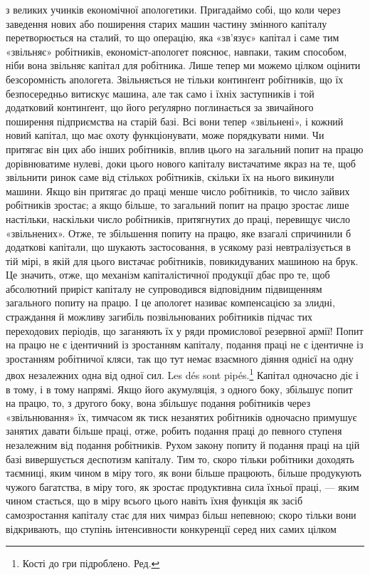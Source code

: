 \parcont{}  %
з великих учинків економічної апологетики. Пригадаймо собі,
що коли через заведення нових або поширення старих машин
частину змінного капіталу перетворюється на сталий, то що
операцію, яка «зв’язує» капітал і саме тим «звільняє» робітників,
економіст-апологет пояснює, навпаки, таким способом,
ніби вона звільняє капітал для робітника. Лише тепер ми можемо
цілком оцінити безсоромність апологета. Звільняється не тільки
континґент робітників, що їх безпосередньо витискує машина,
але так само і їхніх заступників і той додатковий континґент,
що його реґулярно поглинається за звичайного поширення підприємства
на старій базі. Всі вони тепер «звільнені», і кожний
новий капітал, що має охоту функціонувати, може порядкувати
ними. Чи притягає він цих або інших робітників, вплив цього
на загальний попит на працю дорівнюватиме нулеві, доки цього
нового капіталу вистачатиме якраз на те, щоб звільнити ринок
саме від стількох робітників, скільки їх на нього викинули машини.
Якщо він притягає до праці менше число робітників, то
число зайвих робітників зростає; а якщо більше, то загальний
попит на працю зростає лише настільки, наскільки число робітників,
притягнутих до праці, перевищує число «звільнених».
Отже, те збільшення попиту на працю, яке взагалі спричинили б
додаткові капітали, що шукають застосовання, в усякому разі
невтралізується в тій мірі, в якій для цього вистачає робітників,
повикидуваних машиною на брук. Це значить, отже, що механізм
капіталістичної продукції дбає про те, щоб абсолютний приріст
капіталу не супроводився відповідним підвищенням загального
попиту на працю. І це апологет називає компенсацією за злидні,
страждання й можливу загибіль позвільнюваних робітників підчас
тих переходових періодів, що заганяють їх у ряди промислової
резервної армії! Попит на працю не є ідентичний із зростанням
капіталу, подання праці не є ідентичне із зростанням робітничої
кляси, так що тут немає взаємного діяння однієї на одну двох
незалежних одна від одної сил. Les dés sont pipés.\footnote*{
Кості до гри підроблено. Ред.
} Капітал
одночасно діє і в тому, і в тому напрямі. Якщо його акумуляція,
з одного боку, збільшує попит на працю, то, з другого боку,
вона збільшує подання робітників через «звільнювання» їх,
тимчасом як тиск незанятих робітників одночасно примушує
занятих давати більше праці, отже, робить подання праці до
певного ступеня незалежним від подання робітників. Рухом закону
попиту й подання праці на цій базі вивершується деспотизм
капіталу. Тим то, скоро тільки робітники доходять таємниці,
яким чином в міру того, як вони більше працюють, більше продукують
чужого багатства, в міру того, як зростає продуктивна
сила їхньої праці, — яким чином стається, що в міру всього цього
навіть їхня функція як засіб самозростання капіталу стає для
них чимраз більш непевною; скоро тільки вони відкривають,
що ступінь інтенсивности конкуренції серед них самих цілком
\parbreak{}  %
